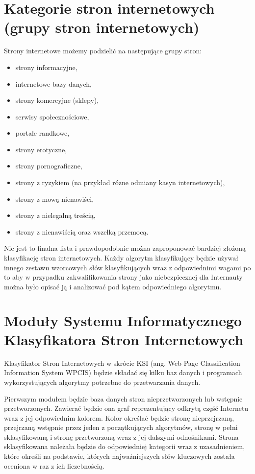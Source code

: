 \documentclass[9pt,twoside,a4paper]{article}
\begin{document}
\section{Kategorie stron internetowych (grupy stron internetowych)}
Strony internetowe możemy podzielić na następujące grupy stron:
\begin{itemize}
\item strony informacyjne,
\item	internetowe bazy danych,
\item	strony komercyjne (sklepy),
\item	serwisy społecznościowe,
\item	portale randkowe,
\item	strony erotyczne,
\item	strony pornograficzne,
\item	strony z ryzykiem (na przykład rózne odmiany kasyn internetowych),
\item	strony z mową nienawiści,
\item	strony z nielegalną treścią,
\item	strony z nienawiścią oraz wszelką przemocą.
\end{itemize}

Nie jest to finalna lista i prawdopodobnie można zaproponować bardziej złożoną klasyfikację stron internetowych. Każdy algorytm klasyfikujący będzie używał innego zestawu wzorcowych słów klasyfikujących wraz z odpowiednimi wagami po to aby w przypadku zakwalifikowania strony jako niebezpiecznej dla Internauty można było opisać ją i analizować pod kątem odpowiedniego algorytmu.

\section{Moduły Systemu Informatycznego Klasyfikatora Stron Internetowych}

Klasyfikator Stron Internetowych w skrócie KSI (ang. Web Page Classification Information System WPCIS) będzie składać się kilku baz danych i programach wykorzystujących algorytmy potrzebne do przetwarzania danych.

Pierwszym modułem będzie baza danych stron nieprzetworzonych lub wstępnie przetworzonych. Zawierać będzie ona graf reprezentujący odkrytą część Internetu wraz z jej odpowiednim kolorem. Kolor określać będzie stronę nieprzejrzaną, przejrzaną wstępnie przez jeden z początkujących algorytmów, stronę w pełni sklasyfikowaną i stronę przetworzoną wraz z jej dalszymi odnośnikami. Strona sklasyfikowana należała będzie do odpowiedniej kategorii wraz z uzasadnieniem, które określi na podstawie, których najważniejszych słów kluczowych została oceniona w raz z ich liczebnością.
\end{document}
